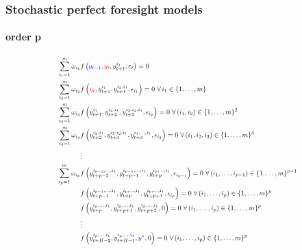 \documentclass{beamer}
\begin{document}
\begin{frame}%
   \frametitle{Stochastic perfect foresight models}
   \framesubtitle{order p}


   \[
      \scalebox{0.7}{$%
            \begin{split}
               \sum_{i_1=1}^m \omega_{i_1} & f\left({\color{blue}y_{t-1}}, {\color{red}y_t}, y_{t+1}^{i_1}, \varepsilon_t \right) = 0                                                                                                   \\
               \sum_{i_2=1}^m \omega_{i_2} & f\left({\color{red}y_{t}}, y_{t+1}^{i_1}, y_{t+1}^{i_2,i_1}, \epsilon_{i_1} \right) = 0\,\, \forall\, i_1\in \{1,\dots,m\}                                                                 \\
               \sum_{i_3=1}^m \omega_{i_3} & f\left(y_{t+1}^{i_1}, y_{t+2}^{i_2, i_1}, y_{t+3}^{i_3,i_2,i_1}, \epsilon_{i_2} \right) = 0\,\,  \forall\, (i_1,i_2)\in \{1,\dots,m\}^2                                                    \\
               \sum_{i_4=1}^m \omega_{i_4} & f\left(y_{t+2}^{i_2,i_1}, y_{t+3}^{i_3,i_2,i_1}, y_{t+3}^{i_4,\ldots,i_1}, \epsilon_{i_3} \right) = 0\,\,  \forall\, (i_1,i_2,i_3)\in \{1,\dots,m\}^3                                      \\
                                           & \vdots                                                                                                                                                                                     \\
               \sum_{i_p=1}^m \omega_{i_p} & f\left(y_{t+p-2}^{i_{p-2},\ldots,i_1}, y_{t+p-1}^{i_{p-1},\ldots,i_1}, y_{t+p}^{i_p,\ldots,i_1}, \epsilon_{i_{p-1}} \right) = 0\,\,  \forall\, (i_1,\ldots,i_{p-1})\in \{1,\dots,m\}^{p-1} \\
                                           & f\left(y_{t+p-1}^{i_{p-1},\ldots,i_1}, y_{t+p}^{i_{p},\ldots,i_1}, y_{t+p+1}^{i_p,\ldots,i_1}, \epsilon_{i_{p}} \right) = 0\,\,  \forall\, (i_1,\ldots,i_{p})\in \{1,\dots,m\}^{p}         \\
                                           & f\left(y_{t+p}^{i_{p},\ldots,i_1}, y_{t+p+1}^{i_{p},\ldots,i_1}, y_{t+p+2}^{i_p,\ldots,i_1}, 0 \right) = 0\,\,  \forall\, (i_1,\ldots,i_{p})\in \{1,\dots,m\}^{p}                          \\
                                           & \vdots                                                                                                                                                                                     \\
                                           & f\left(y_{t+H-2}^{i_{p},\ldots,i_1}, y_{t+H-1}^{i_{p},\ldots,i_1}, {\color{blue}y^{\star}}, 0 \right) = 0\,\,  \forall\, (i_1,\ldots,i_{p})\in \{1,\dots,m\}^{p}
            \end{split}$%
      }
   \]

\end{frame}
\end{document}
